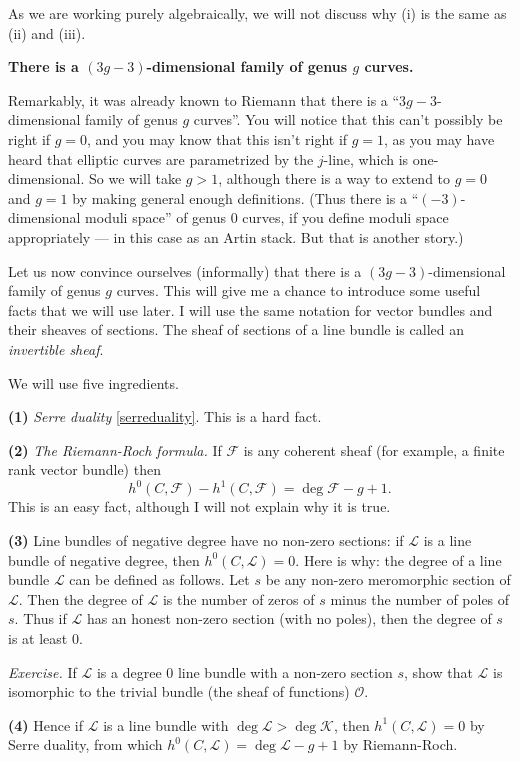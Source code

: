 \documentclass[12pt,letterpaper]{amsart}
\newcommand{\bpoint}[1]{\vspace{3mm}\par \noindent \refstepcounter{subsection}{\bf \thesubsection.} 
  {\bf #1.} }
\newcommand{\cF}{{\mathcal{F}}}
\newcommand{\oh}{{\mathcal{O}}}
\newcommand{\cK}{{\mathcal{K}}}
\renewcommand{\cL}{{\mathcal{L}}}
\newcommand{\lremind}[1]{{\bf[label:  #1]}}
\renewcommand{\lremind}[1]{{}}
\begin{document}
{As we are working purely algebraically, we will not discuss why (i) is
the same as (ii) and (iii).

\bpoint{There is a $(3g-3)$-dimensional family of genus $g$ curves}

Remarkably, it was already known to  Riemann \cite[p.~134]{riemannref}
that there is a ``$3g-3$-dimensional family of genus $g$
curves''.\label{riemann}\lremind{riemann} You will notice that this
can't possibly be right if $g=0$, and you may know that this isn't
right if $g=1$, as you may have heard that elliptic curves are
parametrized by the $j$-line, which is one-dimensional.  So we will
take $g>1$, although there is a way to extend to $g=0$ and $g=1$  by making general enough
definitions.  (Thus there is a ``$(-3)$-dimensional moduli space'' of
genus $0$ curves, if you define moduli space appropriately --- in this
case as an Artin stack.  But that is another story.)

Let us now convince ourselves (informally) that there is a
$(3g-3)$-dimensional family of genus $g$ curves.  This will give me a
chance to introduce some useful facts that we will use later.  I will
use the same notation for vector bundles and their sheaves of
sections.  The sheaf of sections of a line bundle is called an {\em
  invertible sheaf}.


We will use five ingredients.

\noindent
{\bf (1)}  {\em Serre duality} \eqref{serreduality}.  
This is a hard fact.

\noindent
{\bf (2)}   {\em The Riemann-Roch formula.}
If $\cF$ is any coherent sheaf (for example, a finite rank vector bundle)
then $$
\boxed{h^0(C, \cF) - h^1(C, \cF) = \deg \cF - g + 1.}$$
This is an easy fact, although I will not explain why it is true.

\noindent
{\bf (3)} Line bundles of negative degree have no non-zero sections:
if $\cL$ is a line bundle of negative degree, then $\boxed{h^0(C, \cL) = 0}$.
Here is why: the degree of a line bundle $\cL$ can be defined as
follows.  Let $s$ be any non-zero meromorphic section of $\cL$.  Then
the degree of $\cL$ is the number of zeros of $s$ minus the number
of poles of $s$.  Thus if $\cL$ has an honest non-zero section (with no poles),
then the degree of $s$ is at least $0$. 

\noindent 
{\em Exercise.}  If $\cL$ is a degree $0$ line bundle with
a non-zero section $s$, show that $\cL$ is isomorphic to the trivial
bundle (the sheaf of functions) $\oh$.

\noindent
{\bf (4)}  Hence if $\cL$ is a line bundle with $\deg \cL > \deg \cK$,
then $h^1(C, \cL) = 0$ by Serre duality, from which
$\boxed{h^0(C, \cL) = \deg \cL - g + 1}$ by Riemann-Roch.

}
\end{document}
